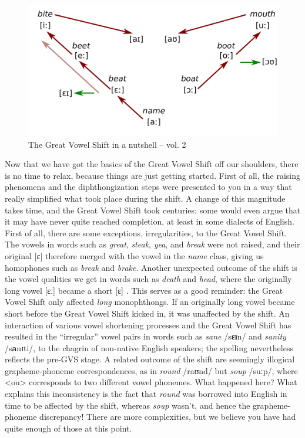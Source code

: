 \begin{figure}
        \includegraphics[height=.25\textheight]{chapters/img/EModEVowels3a.pdf}
    \caption{The Great Vowel Shift in a nutshell -- vol. 2}
    \label{fig:EModEVowels3}
\end{figure}

\noindent Now that we have got the basics of the Great Vowel Shift off our shoulders, there is no time to relax, because things are just getting started. First of all, the raising phenomena and the diphthongization steps were presented to you in a way that really simplified what took place during the shift. A change of this magnitude takes time, and the Great Vowel Shift took centuries: some would even argue that it may have never quite reached completion, at least in some dialects of English. First of all, there are some exceptions, irregularities, to the Great Vowel Shift. The vowels in words such as \textit{great}, \textit{steak}, \textit{yea}, and \textit{break} were not raised, and their original [ɛ] therefore merged with the vowel in the \textit{name} class, giving us homophones such as \textit{break} and \textit{brake}. Another unexpected outcome of the shift is the vowel qualities we get in words such as \textit{death} and \textit{head}, where the originally long vowel [ɛː] became a short [ɛ] \citep[251]{MillHay2018}. This serves as a good reminder: the Great Vowel Shift only affected \textit{long} monophthongs. If an originally long vowel became short before the Great Vowel Shift kicked in, it was unaffected by the shift. An interaction of various vowel shortening processes and the Great Vowel Shift has resulted in the ``irregular'' vowel pairs in words such as \textit{sane} /s\textbf{ɛɪ}n/ and \textit{sanity} /s\textbf{a}nɪti/, to the chagrin of non-native English speakers; the spelling nevertheless reflects the pre-GVS stage. A related outcome of the shift are seemingly illogical grapheme-phoneme correspondences, as in \textit{round} /raʊnd/ but \textit{soup} /suːp/, where <ou> corresponds to two different vowel phonemes. What happened here? What explains this inconsistency is the fact that \textit{round} was borrowed into English in time to be affected by the shift, whereas \textit{soup} wasn't, and hence the grapheme-phoneme discrepancy! There are more complexities, but we believe you have had quite enough of those at this point.


